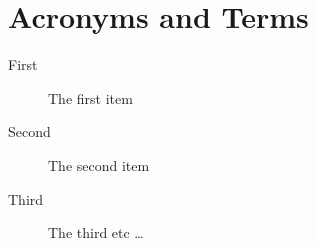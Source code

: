 \chapter{Acronyms and Terms}\label{appA}

\begin{description}
	\item[First] The first item
	\item[Second] The second item
	\item[Third] The third etc \ldots
\end{description}

